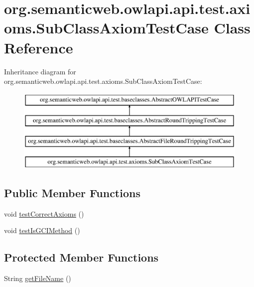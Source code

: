 \hypertarget{classorg_1_1semanticweb_1_1owlapi_1_1api_1_1test_1_1axioms_1_1_sub_class_axiom_test_case}{\section{org.\-semanticweb.\-owlapi.\-api.\-test.\-axioms.\-Sub\-Class\-Axiom\-Test\-Case Class Reference}
\label{classorg_1_1semanticweb_1_1owlapi_1_1api_1_1test_1_1axioms_1_1_sub_class_axiom_test_case}
}
Inheritance diagram for org.\-semanticweb.\-owlapi.\-api.\-test.\-axioms.\-Sub\-Class\-Axiom\-Test\-Case\-:\begin{figure}[H]
\begin{center}
\leavevmode
\includegraphics[height=4.000000cm]{classorg_1_1semanticweb_1_1owlapi_1_1api_1_1test_1_1axioms_1_1_sub_class_axiom_test_case}
\end{center}
\end{figure}
\subsection*{Public Member Functions}
\begin{DoxyCompactItemize}
\item 
void \hyperlink{classorg_1_1semanticweb_1_1owlapi_1_1api_1_1test_1_1axioms_1_1_sub_class_axiom_test_case_a9ddd283b85a9eccd4a3ddc83a3e00057}{test\-Correct\-Axioms} ()
\item 
void \hyperlink{classorg_1_1semanticweb_1_1owlapi_1_1api_1_1test_1_1axioms_1_1_sub_class_axiom_test_case_aa813f6cbbfcc08b6ceb7f097d47d13f6}{test\-Is\-G\-C\-I\-Method} ()
\end{DoxyCompactItemize}
\subsection*{Protected Member Functions}
\begin{DoxyCompactItemize}
\item 
String \hyperlink{classorg_1_1semanticweb_1_1owlapi_1_1api_1_1test_1_1axioms_1_1_sub_class_axiom_test_case_a5ca4e3e24e7913bbb40003353a3088de}{get\-File\-Name} ()
\end{DoxyCompactItemize}


